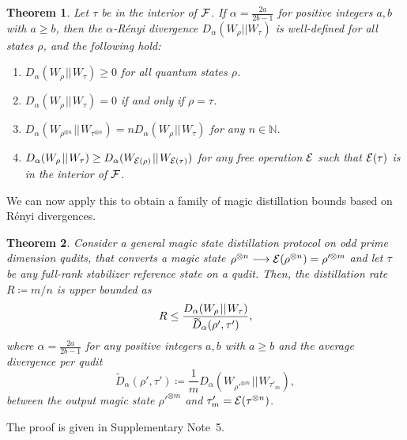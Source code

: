 \documentclass[
onecolumn,
superscriptaddress
]{revtex4-1}
\newtheorem{theorem}{Theorem}
\def\E{{\cal E}}
\def\F{{\cal F}}
\begin{document}
\begin{theorem}\label{thm:Da_props} 
	Let $\tau$ be in the interior of $\F$. 
	If $\alpha = \frac{2a}{2b-1}$ for positive integers $a,b$ with $a \geq b$, then the $\alpha$-R\'{e}nyi divergence $D_\alpha(W_\rho || W_\tau)$ is well-defined for all states $\rho$, and the following hold:
\begin{enumerate}
\item $D_\alpha(W_\rho \hspace{1pt}||\hspace{1pt} W_\tau) \ge 0$ for all quantum states $\rho$.
\item  $D_\alpha(W_\rho \hspace{1pt}||\hspace{1pt} W_\tau) = 0$ if and only if $\rho =\tau$.
\item $D_\alpha(W_{\rho^{\otimes n}} \hspace{1pt}||\hspace{1pt} W_{\tau^{\otimes n}}) = n D_\alpha(W_\rho \hspace{1pt}||\hspace{1pt} W_\tau)$ for any $n \in \mathbb{N}$.
\item $D_\alpha(W_\rho \hspace{1pt}||\hspace{1pt} W_\tau) \geq D_\alpha (W_{\E(\rho)} \hspace{1pt}||\hspace{1pt} W_{\E(\tau)})$ for any free operation $\E$ such that $\E(\tau)$ is in the interior of $\F$.
\end{enumerate}
\end{theorem}

We can now apply this to obtain a family of magic distillation bounds based on R\'{e}nyi divergences.

\begin{theorem}\label{thm:entropic_bounds}
	Consider a general magic state distillation protocol on odd prime dimension qudits, that converts a magic state $\rho^{\otimes n} \longrightarrow \E(\rho^{\otimes n})=\rho'^{\otimes m}$ and let $\tau$ be any full-rank stabilizer reference state on a qudit. Then, the distillation rate $R \coloneqq m/n$ is upper bounded as
	\begin{equation}
		R \leq \frac{D_{\alpha}(W_\rho \hspace{1pt}||\hspace{1pt} W_\tau)}{\rlap{\raisebox{-0.2ex}{$\widetilde{\phantom{D}}$}}D_\alpha( \rho', \tau')},
	\end{equation}
	where $\alpha = \frac{2a}{2b-1}$ for any positive integers $a,b$ with $a \geq b$ and the average divergence per qudit
	\begin{equation}
\widetilde{D}_\alpha( \rho', \tau') \coloneqq \frac{1}{m} D_\alpha (W_{\rho'^{\otimes m}} \hspace{1pt}||\hspace{1pt} W_{\tau'_m}),
\end{equation}
between the output magic state $\rho'^{\otimes m}$ and $\tau'_m = \E(\tau^{\otimes n})$.
\end{theorem}
The proof is given in Supplementary Note~5. 
\end{document}
